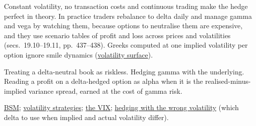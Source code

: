 \begin{qfmethod}
 Constant volatility, no transaction costs and continuous trading make the hedge perfect in theory. In practice traders rebalance to delta daily and manage gamma and vega by watching them, because options to neutralise them are expensive, and they use scenario tables of profit and loss across prices and volatilities (secs.~19.10--19.11, pp.~437--438). Greeks computed at one implied volatility per option ignore smile dynamics (\hyperref[def:implied-volatility-surface]{volatility surface}).

 Treating a delta-neutral book as riskless. Hedging gamma with the underlying. Reading a profit on a delta-hedged option as alpha when it is the realised-minus-implied variance spread, earned at the cost of gamma risk.

 \hyperref[mod:black-scholes-merton]{BSM}; \hyperref[meth:option-spreads-volatility-strategies]{volatility strategies}; \hyperref[def:vix-variance-dividend-swaps]{the VIX}; \hyperref[res:delta-hedging-volatility-mismatch]{hedging with the wrong volatility} (which delta to use when implied and actual volatility differ).

\end{qfmethod}

